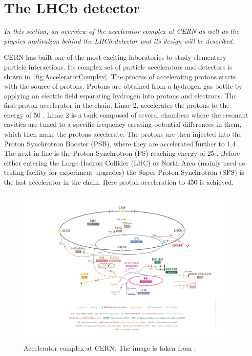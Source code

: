 \chapter{The LHCb detector}
\label{chap:dec}

\textit{In this section, an overview of the accelerator complex at CERN as well as the physics motivation behind the \Gls{LHCb} detector and its design will be described.}

CERN has built one of the most exciting laboratories to study elementary particle interactions. Its complex set of particle accelerators and detectors is shown in~\autoref{fig:AcceleratorComplex}. The process of accelerating protons starts with the source of protons. Protons are obtained from a hydrogen gas bottle by applying an electric field separating hydrogen into protons and electrons. The first proton accelerator in the chain, Linac 2, accelerates the protons to the energy of 50 \mev. Linac 2 is a tank composed of several chambers where the resonant cavities are tuned to a specific frequency creating potential differences in them, which then make the protons accelerate. The protons are then injected into the Proton Synchrotron Booster (\Gls{PSB}), where they are accelerated further to 1.4 \gev. The next in line is the Proton Synchrotron (\Gls{PS}) reaching energy of 25 \gev. Before either entering the Large Hadron Collider (\Gls{LHC}) or North Area (mainly used as testing facility for experiment upgrades) the Super Proton Synchrotron (\Gls{SPS}) is the last accelerator in the chain. Here proton acceleration to 450 \gev is achieved.

\begin{figure}
  \centering
  \includegraphics[scale = 1.0]{figs/detector/AccComplex.png}
	\caption{Accelerator complex at CERN. The image is taken from \cite{complex}.}
  \label{fig:AcceleratorComplex}
\end{figure}


